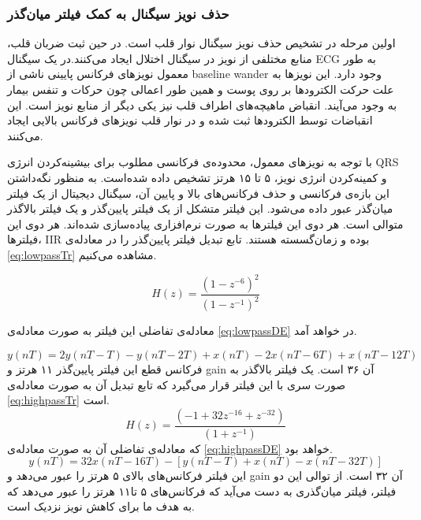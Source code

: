 		\subsubsection{حذف نویز سیگنال به کمک فیلتر میان‌گذر}
		اولین مرحله در تشخیص  حذف نویز سیگنال نوار قلب است. در حین ثبت ضربان قلب، منابع مختلفی از نویز در سیگنال اختلال ایجاد می‌کنند.در یک سیگنال ECG به طور معمول نویزهای فرکانس پایینی ناشی از baseline wander وجود دارد. این نویزها به علت حرکت الکترودها بر روی پوست و همین طور اعمالی چون حرکات و تنفس بیمار به وجود می‌آیند. انقباض ماهیچه‌های اطراف قلب نیز یکی دیگر از منابع نویز است. این انقباضات توسط الکترودها ثبت شده و در نوار قلب نویزهای فرکانس بالایی ایجاد می‌کنند.\cite{Joshi2013}
		
		با توجه به نویزهای معمول، محدوده‌ی فرکانسی مطلوب برای بیشینه‌کردن انرژی QRS و کمینه‌کردن انرژی نویز، ۵ تا ۱۵ هرتز تشخیص داده شده‌است.\cite{Pan1985} به منظور نگه‌داشتن این بازه‌ی فرکانسی و حذف فرکانس‌های بالا و پایین آن، سیگنال دیجیتال از یک فیلتر میان‌گذر عبور داده می‌شود. این فیلتر متشکل از یک فیلتر پایین‌گذر و یک فیلتر بالاگذر متوالی است. هر دوی این فیلترها به صورت نرم‌افزاری پیاده‌سازی شده‌اند. هر دوی این فیلترها، IIR بوده و زمان‌گسسته هستند. 
تابع تبدیل فیلتر پایین‌گذر را در معادله‌ی \ref{eq:lowpassTr} مشاهده می‌کنیم.

\begin{equation}
	H(z) = \frac{{(1-z^{-6})}^2}{{(1-z^{-1})}^2}
\label{eq:lowpassTr}
\end{equation}
	
	معادله‌ی تفاضلی این فیلتر به صورت معادله‌ی \ref{eq:lowpassDE} در خواهد آمد.
	
\begin{equation}
	y(nT) = 2y(nT-T) - y(nT-2T) + x(nT) - 2x(nT-6T) + x(nT-12T) 
\label{eq:lowpassDE}
\end{equation}
فرکانس قطع این فیلتر پایین‌گذر ۱۱ هرتز و gain آن ۳۶ است. یک فیلتر بالاگذر به صورت سری با این فیلتر قرار می‌گیرد که تابع تبدیل آن به صورت معادله‌ی \ref{eq:highpassTr} است.
\begin{equation}
	H(z) = \frac{{(-1+32z^{-16}+z^{-32})}}{{(1+z^{-1})}}
\label{eq:highpassTr}
\end{equation}
که معادله‌ی تفاضلی آن به صورت معادله‌ی \ref{eq:highpassDE} خواهد بود.
 \begin{equation}
	y(nT) = 32x(nT-16T) - [y(nT-T) + x(nT) - x(nT-32T)]
\label{eq:highpassDE}
\end{equation}
این فیلتر فرکانس‌های بالای ۵ هرتز را عبور می‌دهد و gain آن ۳۲ است. از توالی این دو فیلتر، فیلتر میان‌گذری به دست می‌آید که فرکانس‌های ۵ تا۱۱ هرتز را عبور می‌دهد که به هدف ما برای کاهش نویز نزدیک است. 

